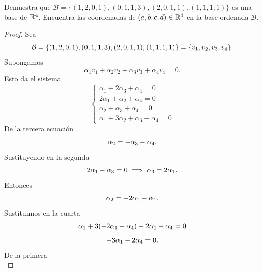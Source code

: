 \documentclass[12pt,a4paper]{article}
\begin{document}
    \begin{mdframed}[style=mdpinkbox,frametitle={Ejercicio 2}]
        Demuestra que $\mathcal{B}=\{(1,2,0,1),(0,1,1,3),(2,0,1,1),(1,1,1,1)\}$ es una base de $\mathbb{R}^{4}$. Encuentra las coordenadas
        de $(a,b,c,d)\in\mathbb{R}^{4}$ en la base ordenada $\mathcal{B}$.
    \end{mdframed}

    \begin{proof}
        Sea
        \begin{equation*}
            \mathcal{B}=\{(1,2,0,1),(0,1,1,3),(2,0,1,1),(1,1,1,1)\}=\{v_{1},v_{2},v_{3},v_{4}\}.
        \end{equation*}
        Supongamos
        \begin{equation*}
            \alpha_{1}v_{1}+\alpha_{2}v_{2}+\alpha_{3}v_{3}+\alpha_{4}v_{4}=0.
        \end{equation*}
        Esto da el sistema
        \begin{equation*}
            \begin{cases}
                \alpha_{1}+2\alpha_{3}+\alpha_{4}=0\\
                2\alpha_{1}+\alpha_{2}+\alpha_{4}=0\\
                \alpha_{2}+\alpha_{3}+\alpha_{4}=0\\
                \alpha_{1}+3\alpha_{2}+\alpha_{3}+\alpha_{4}=0
            \end{cases}
        \end{equation*}
        De la tercera ecuación
        \begin{equation*}
            \alpha_{2}=-\alpha_{3}-\alpha_{4}.
        \end{equation*}
        Sustituyendo en la segunda
        \begin{equation*}
            2\alpha_{1}-\alpha_{3}=0\implies \alpha_{3}=2\alpha_{1}.
        \end{equation*}
        Entonces
        \begin{equation*}
            \alpha_{2}=-2\alpha_{1}-\alpha_{4}.
        \end{equation*}
        Sustituimos en la cuarta
        \begin{equation*}
            \alpha_{1}+3(-2\alpha_{1}-\alpha_{4})+2\alpha_{1}+\alpha_{4}=0
        \end{equation*}
        \begin{equation*}
            -3\alpha_{1}-2\alpha_{4}=0.
        \end{equation*}
        De la primera
        \begin{equation*}

\end{equation*}
\end{proof}
\end{document}
